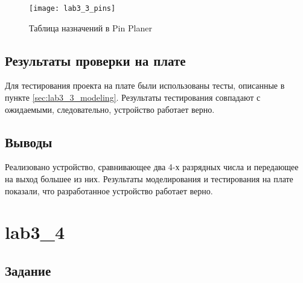 \begin{figure}[H]
\begin{center}
	\texttt{[image: lab3\_3\_pins]}
	\caption{Таблица назначений в Pin Planer}
	\label{fig:lab3_3_pins}
\end{center}
\end{figure}

\subsection{Результаты проверки на плате}

Для тестирования проекта на плате были использованы тесты, описанные в пункте \ref{sec:lab3_3_modeling}. Результаты тестирования совпадают с ожидаемыми, следовательно, устройство работает верно.

\subsection{Выводы}

Реализовано устройство, сравнивающее два 4-х разрядных числа и передающее на выход большее из них. Результаты моделирования и тестирования на плате показали, что разработанное устройство работает верно.

\newpage

\section{lab3\_4}

\subsection{Задание}

